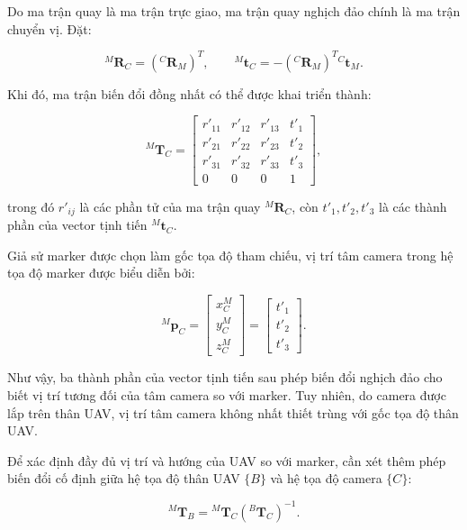 Do ma trận quay là ma trận trực giao, ma trận
quay nghịch đảo chính là ma trận chuyển vị.
Đặt:

\begin{equation}
{}^{M}\mathbf{R}_{C}
=
({}^{C}\mathbf{R}_{M})^{T},
\qquad
{}^{M}\mathbf{t}_{C}
=
-({}^{C}\mathbf{R}_{M})^{T}
{}^{C}\mathbf{t}_{M}.
\label{eq:inverse_pose_components}
\end{equation}

Khi đó, ma trận biến đổi đồng nhất có thể
được khai triển thành:

\begin{equation}
{}^{M}\mathbf{T}_{C}
=
\begin{bmatrix}
r'_{11}&r'_{12}&r'_{13}&t'_1\\
r'_{21}&r'_{22}&r'_{23}&t'_2\\
r'_{31}&r'_{32}&r'_{33}&t'_3\\
0&0&0&1
\end{bmatrix},
\label{eq:camera_pose_expanded}
\end{equation}

trong đó $r'_{ij}$ là các phần tử của
ma trận quay ${}^{M}\mathbf{R}_{C}$,
còn $t'_1,t'_2,t'_3$ là các thành phần
của vector tịnh tiến ${}^{M}\mathbf{t}_{C}$.

Giả sử marker được chọn làm gốc tọa độ
tham chiếu, vị trí tâm camera trong hệ
tọa độ marker được biểu diễn bởi:

\begin{equation}
{}^{M}\mathbf{p}_{C}
=
\begin{bmatrix}
x_C^M\\
y_C^M\\
z_C^M
\end{bmatrix}
=
\begin{bmatrix}
t'_1\\
t'_2\\
t'_3
\end{bmatrix}.
\label{eq:camera_position_marker}
\end{equation}

Như vậy, ba thành phần của vector tịnh tiến
sau phép biến đổi nghịch đảo cho biết vị trí
tương đối của tâm camera so với marker.
Tuy nhiên, do camera được lắp trên thân UAV,
vị trí tâm camera không nhất thiết trùng
với gốc tọa độ thân UAV.

Để xác định đầy đủ vị trí và hướng của UAV
so với marker, cần xét thêm phép biến đổi
cố định giữa hệ tọa độ thân UAV $\{B\}$ và
hệ tọa độ camera $\{C\}$:

\begin{equation}
{}^{M}\mathbf{T}_{B}
=
{}^{M}\mathbf{T}_{C}
\left({}^{B}\mathbf{T}_{C}\right)^{-1}.
\label{eq:body_in_marker}
\end{equation}

